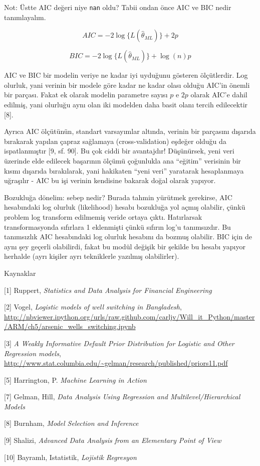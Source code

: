 \documentclass[12pt,fleqn]{article}\usepackage{../../common}
\begin{document}
Not: Üstte AIC değeri niye \verb!nan! oldu? Tabii ondan önce AIC ve BIC
nedir tanımlayalım. 

$$ AIC = -2\log \{ L(\hat{\theta}_{ML}) \} + 2p $$

$$ BIC = -2\log \{ L(\hat{\theta}_{ML}) \} + \log(n)p $$

AIC ve BIC bir modelin veriye ne kadar iyi uyduğunu gösteren ölçütlerdir. Log
olurluk, yani verinin bir modele göre kadar ne kadar olası olduğu AIC'in önemli
bir parçası. Fakat ek olarak modelin parametre sayısı $p$ e $2p$ olarak AIC'e
dahil edilmiş, yani olurluğu aynı olan iki modelden daha basit olanı tercih
edilecektir [8].

Ayrıca AIC ölçütünün, standart varsayımlar altında, verinin bir parçasını
dışarıda bırakarak yapılan çapraz sağlamaya (cross-validation) eşdeğer olduğu da
ispatlanmıştır [9, sf. 90]. Bu çok ciddi bir avantajdır!  Düşünürsek, yeni veri
üzerinde elde edilecek başarının ölçümü çoğunlukla ana ``eğitim'' verisinin bir
kısmı dışarıda bırakılarak, yani hakikaten ``yeni veri'' yaratarak hesaplanmaya
uğraşılır - AIC bu işi verinin kendisine bakarak doğal olarak yapıyor.

Bozukluğa dönelim: sebep nedir? Burada tahmin yürütmek gerekirse, AIC
hesabındaki log olurluk (likelihood) hesabı bozukluğa yol açmış olabilir, çünkü
problem log transform edilmemiş veride ortaya çıktı. Hatırlarsak
transformasyonda sıfırlara 1 eklenmişti çünkü sıfırın log'u tanımsızdır. Bu
tanımsızlık AIC hesabındaki log olurluk hesabını da bozmuş olabilir. BIC için de
aynı şey geçerli olabilirdi, fakat bu modül değişik bir şekilde bu hesabı
yapıyor herhalde (ayrı kişiler ayrı tekniklerle yazılmış olabilirler).

Kaynaklar

[1] Ruppert, {\em Statistics and Data Analysis for Financial Engineering}

[2] Vogel, {\em Logistic models of well switching in Bangladesh}, 
    \url{http://nbviewer.ipython.org/urls/raw.github.com/carljv/Will_it_Python/master/ARM/ch5/arsenic_wells_switching.ipynb}

[3] {\em A Weakly Informative Default Prior Distribution for Logistic and Other Regression models}, 
    \url{http://www.stat.columbia.edu/~gelman/research/published/priors11.pdf}

[5] Harrington, P. {\em Machine Learning in Action}

[7] Gelman, Hill, {\em Data Analysis Using Regression and Multilevel/Hierarchical Models}

[8] Burnham, {\em Model Selection and Inference}

[9] Shalizi, {\em Advanced Data Analysis from an Elementary Point of View}

[10] Bayramlı, Istatistik, {\em Lojistik Regresyon}
\end{document}
